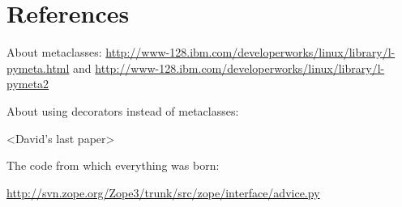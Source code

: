 \documentclass[10pt,a4paper,english]{article}
\begin{document}
\hypertarget{references}{}
\section*{References}

About metaclasses:
\href{http://www-128.ibm.com/developerworks/linux/library/l-pymeta.html}{http://www-128.ibm.com/developerworks/linux/library/l-pymeta.html} and
\href{http://www-128.ibm.com/developerworks/linux/library/l-pymeta2}{http://www-128.ibm.com/developerworks/linux/library/l-pymeta2}

About using decorators instead of metaclasses:

{\textless}David's last paper{\textgreater}

The code from which everything was born:

\href{http://svn.zope.org/Zope3/trunk/src/zope/interface/advice.py}{http://svn.zope.org/Zope3/trunk/src/zope/interface/advice.py}



\hypertarget{questions-and-answers}{}
\end{document}
